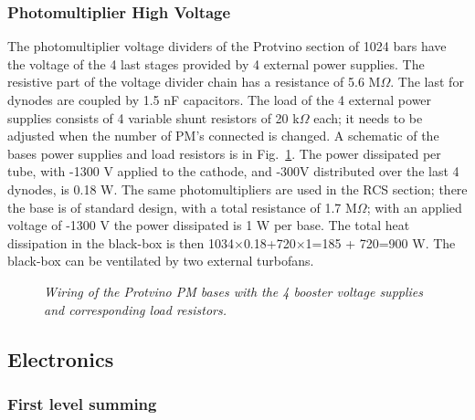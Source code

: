 \documentclass{chowto}
\begin{document}
\subsubsection{Photomultiplier High Voltage}

The photomultiplier voltage dividers of the Protvino section of 1024 bars
have the voltage of the 4 last stages provided by 4 external power supplies.
The resistive part of the voltage divider chain has a resistance of 5.6 
M$\Omega$. The last for dynodes are coupled by 1.5 nF capacitors. The load
of the 4 external power supplies consists of 4 variable shunt resistors of 20
k$\Omega$ each; it needs to be adjusted when the number of PM's connected is 
changed. A schematic of the bases power supplies and load resistors is in 
Fig.~\ref{fig:PMHV}. The power dissipated per tube, with -1300 V applied to the cathode, and -300V distributed over the last 4 dynodes, is 0.18 W.
The same photomultipliers are used in the RCS section; there the base is of 
standard design, with a total resistance of 1.7 M$\Omega$; with an applied 
voltage of -1300 V the power dissipated is 1 W per base. The total heat 
dissipation in the black-box is then 
1034$\times$0.18+720$\times$1=185 + 720=900 W. The black-box can be 
ventilated by two external turbofans.  

\begin{figure}[h]
\begin{center}

\caption[]{\it{Wiring of the Protvino PM bases with the 4 booster voltage supplies and corresponding load resistors.}}
\label{fig:PMHV}
\end{center}
\end{figure}

\subsection{Electronics}
\label{electronics}
\subsubsection{First level summing}

\begin{figure}[h]
\begin{center}
\caption[]{\it{}}
\label{fig:firstlevel}
\end{center}
\end{figure}
\end{document}
